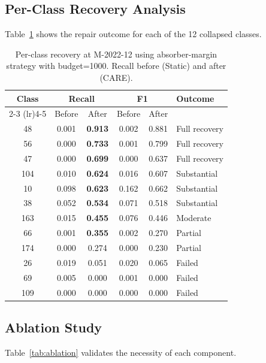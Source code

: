 \documentclass[journal]{IEEEtran}
\newcommand{\ours}{CARE}  %
\begin{document}
\subsection{Per-Class Recovery Analysis}

Table~\ref{tab:per_class} shows the repair outcome for each of the 12 collapsed classes.

\begin{table}[t]
\centering
\caption{Per-class recovery at M-2022-12 using absorber-margin strategy with budget=1000. Recall before (Static) and after (\ours{}).}
\label{tab:per_class}
\small
\begin{tabular}{@{}c cc cc l@{}}
\toprule
Class & \multicolumn{2}{c}{Recall} & \multicolumn{2}{c}{F1} & Outcome \\
\cmidrule(lr){2-3} \cmidrule(lr){4-5}
      & Before & After & Before & After & \\
\midrule
48  & 0.001 & \textbf{0.913} & 0.002 & 0.881 & Full recovery \\
56  & 0.000 & \textbf{0.733} & 0.001 & 0.799 & Full recovery \\
47  & 0.000 & \textbf{0.699} & 0.000 & 0.637 & Full recovery \\
104 & 0.010 & \textbf{0.624} & 0.016 & 0.607 & Substantial \\
10  & 0.098 & \textbf{0.623} & 0.162 & 0.662 & Substantial \\
38  & 0.052 & \textbf{0.534} & 0.071 & 0.518 & Substantial \\
163 & 0.015 & \textbf{0.455} & 0.076 & 0.446 & Moderate \\
66  & 0.001 & \textbf{0.355} & 0.002 & 0.270 & Partial \\
174 & 0.000 & 0.274 & 0.000 & 0.230 & Partial \\
\midrule
26  & 0.019 & 0.051 & 0.020 & 0.065 & Failed \\
69  & 0.005 & 0.000 & 0.001 & 0.000 & Failed \\
109 & 0.000 & 0.000 & 0.000 & 0.000 & Failed \\
\bottomrule
\end{tabular}
\end{table}

\subsection{Ablation Study}

Table~\ref{tab:ablation} validates the necessity of each component.
\end{document}
